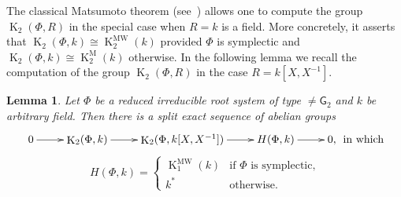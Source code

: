 \documentclass[oneside, 8pt]{amsart}
\newtheorem{lemma}{Lemma}
\theoremstyle{remark}
\theoremstyle{definition}
\numberwithin{lemma}{section}
\numberwithin{prop}{section}
\numberwithin{corollary}{section}
\numberwithin{externaltheorem}{section}
\DeclareMathOperator{\K}{K}
\newcommand{\inv}{^{-1}}
\newcommand{\rG}{\mathsf{G}}
\numberwithin{equation}{section}
\begin{document}
\begin{comment}
Suppose for a moment that $\langle \alpha, \beta \rangle = -1$ and  $\langle \beta, \alpha \rangle = -1$ then
\[ \{s, t^{-1} \} = \{s,  t^{-1}\}_\alpha = \{t, s^{-1} \}_\beta^{-1} = \{s^{-1}, t\} \]
In particular, $\{s, s^{-1}\} = \{s, s^{-1}\}^{-1}$ 
\end{comment}
The classical Matsumoto theorem (see~\cite[Theorem~5.10]{Ma69}) allows one to compute the group $\K_2(\Phi, R)$ in the special case when $R=k$ is a field. More concretely, it asserts that $\K_2(\Phi, k) \cong \K_2^\mathrm{MW}(k)$ provided $\Phi$ is symplectic and  $\K_2(\Phi, k) \cong \K_2^\mathrm{M}(k)$ otherwise. In the following lemma we 
recall the computation of the group $\K_2(\Phi, R)$ in the case $R=k[X, X\inv]$.
\begin{lemma}\label{K2-laurent-field} Let $\Phi$ be a reduced irreducible root system of type $\neq \rG_2$ and $k$ be arbitrary field. Then there is a split exact sequence of abelian groups
\[ \xymatrix{ 0 \ar[r] & \K_2(\Phi, k) \ar[r] & \K_2(\Phi, k[X, X^{-1}]) \ar[r] & H(\Phi, k) \ar[r] & 0,}\text{ in which} \]
\[ H(\Phi, k) = \left\{\begin{array}{ll} \K_1^\mathrm{MW}(k)& \text{if $\Phi$ is symplectic,}\\ k^* & \text{otherwise.}  \end{array}\right. \]  \end{lemma}
\end{document}
